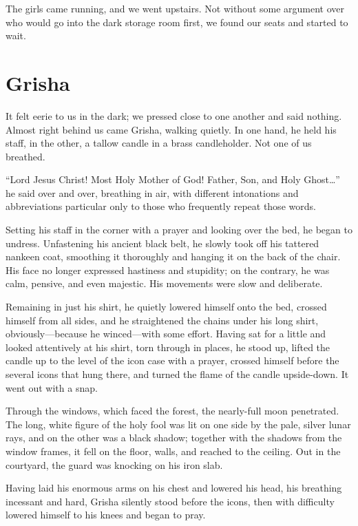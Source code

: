 The girls came running, and we went upstairs. Not without some argument over who would go into the dark storage room first, we found our seats and started to wait.

\chapter{Grisha} %

It felt eerie to us in the dark; we pressed close to one another and said nothing. Almost right behind us came Grisha, walking quietly. In one hand, he held his staff, in the other, a tallow candle in a brass candleholder. Not one of us breathed.

``Lord Jesus Christ! Most Holy Mother of God! Father, Son, and Holy Ghost\ldots{}'' he said over and over, breathing in air, with different intonations and abbreviations particular only to those who frequently repeat those words.

Setting his staff in the corner with a prayer and looking over the bed, he began to undress. Unfastening his ancient black belt, he slowly took off his tattered nankeen coat, smoothing it thoroughly and hanging it on the back of the chair. His face no longer expressed hastiness and stupidity; on the contrary, he was calm, pensive, and even majestic. His movements were slow and deliberate.

Remaining in just his shirt, he quietly lowered himself onto the bed, crossed himself from all sides, and he straightened the chains under his long shirt, obviously---because he winced---with some effort. Having sat for a little and looked attentively at his shirt, torn through in places, he stood up, lifted the candle up to the level of the icon case with a prayer, crossed himself before the several icons that hung there, and turned the flame of the candle upside-down. It went out with a snap.

Through the windows, which faced the forest, the nearly-full moon penetrated. The long, white figure of the holy fool was lit on one side by the pale, silver lunar rays, and on the other was a black shadow; together with the shadows from the window frames, it fell on the floor, walls, and reached to the ceiling. Out in the courtyard, the guard was knocking on his iron slab.

Having laid his enormous arms on his chest and lowered his head, his breathing incessant and hard, Grisha silently stood before the icons, then with difficulty lowered himself to his knees and began to pray.

